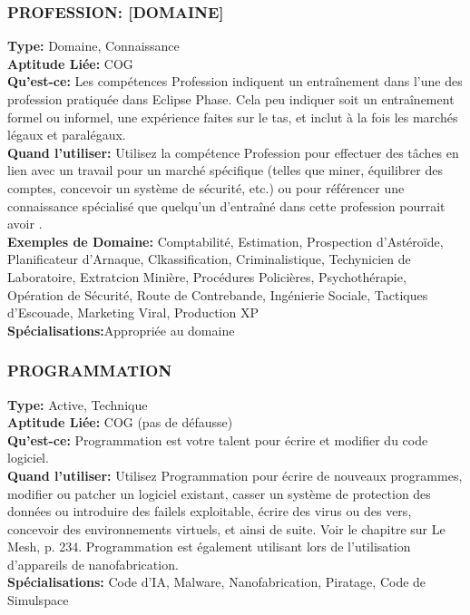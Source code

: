 \subsubsection{PROFESSION: [DOMAINE]} \textbf{Type:} Domaine, Connaissance\\ \textbf{Aptitude Liée:} COG \\ \textbf{Qu'est-ce:} Les compétences Profession indiquent un entraînement dans l'une des profession pratiquée dans Eclipse Phase. Cela peu indiquer soit un entraînement formel ou informel, une expérience faites sur le tas, et inclut à la fois les marchés légaux et paralégaux. \\ \textbf{Quand l'utiliser:} Utilisez la compétence Profession pour effectuer des tâches en lien avec un travail pour un marché spécifique (telles que miner, équilibrer des comptes, concevoir un système de sécurité, etc.) ou pour référencer une connaissance spécialisé que quelqu'un d'entraîné dans cette profession pourrait avoir . \\ \textbf{Exemples de Domaine:} Comptabilité, Estimation, Prospection d'Astéroïde, Planificateur d'Arnaque, Clkassification, Criminalistique, Techynicien de Laboratoire, Extratcion Minière, Procédures Policières, Psychothérapie, Opération de Sécurité, Route de Contrebande, Ingénierie Sociale, Tactiques d'Escouade, Marketing Viral, Production XP\\ \textbf{Spécialisations:}Appropriée au domaine 

\subsubsection{PROGRAMMATION} \textbf{Type:} Active, Technique\\ \textbf{Aptitude Liée:} COG (pas de défausse) \\ \textbf{Qu'est-ce:} Programmation est votre talent pour écrire et modifier du code logiciel. \\ \textbf{Quand l'utiliser:} Utilisez Programmation pour écrire de nouveaux programmes, modifier ou patcher un logiciel existant, casser un système de protection des données ou introduire des failels exploitable, écrire des virus ou des vers, concevoir des environnements virtuels, et ainsi de suite. Voir le chapitre sur Le Mesh, p. 234. Programmation est également utilisant lors de l'utilisation d'appareils de nanofabrication. \\ \textbf{Spécialisations:} Code d'IA, Malware, Nanofabrication, Piratage, Code de Simulspace 

